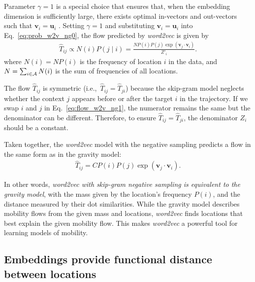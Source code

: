 \documentclass[12pt]{article} %
\newcommand{\vect}[1]{\boldsymbol{#1}}
\def\given{\mid}
\def\ie{i.e.,~}
\begin{document}
Parameter $\gamma=1$ is a special choice that ensures that, when the embedding dimension is sufficiently large, there exists optimal in-vectors and out-vectors such that $\vect{v}_i = \vect{u}_i$ \autocite{levy2014neural}.
Setting $\gamma = 1$ and substituting $\vect{v}_i = \vect{u}_i$ into Eq.~\ref{eq:prob_w2v_ng0}, the flow predicted by {\it word2vec} is given by
\begin{align}
	\widehat{T}_{ij} \propto  N(i) P(j\given i) = \frac{NP(i)P(j)\exp(\vect{v}_j \cdot \vect{v}_{i})}{Z'_i}. \label{eq:flow_w2v_ng1}
\end{align}
where $N(i) = NP(i)$ is the frequency of location $i$ in the data, and $N=\sum_{i \in {\cal A}} N(i)$ is the sum of frequencies of all locations.

The flow $\widehat{T}_{ij}$ is symmetric (\ie $\widehat{T}_{ij}=\widehat{T}_{ji}$) because the skip-gram model neglects whether the context $j$ appears before or after the target $i$ in the trajectory.
If we swap $i$ and $j$ in Eq.~\ref{eq:flow_w2v_ng1}, the numerator remains the same but the denominator can be different.
Therefore, to ensure $\widehat{T}_{ij}=\widehat{T}_{ji}$, the denominator $Z_i$ should be a constant.

Taken together, the {\it word2vec} model with the negative sampling predicts a flow in the same form as in the gravity model:
\begin{align}
	\hat{T}_{ij}=  C P(i) P(j)  \exp(\bm{v}_j \cdot \bm{v}_{i}). \label{eq:flow_w2v_ng0}
\end{align}

In other words, \emph{word2vec with skip-gram negative sampling is equivalent to the gravity model}, with the mass given by the location's frequency $P(i)$, and the distance measured by their dot similarities.
While the gravity model describes mobility flows from the given mass and locations, {\it word2vec}
finds locations that best explain the given mobility flow.
This makes \textit{word2vec} a powerful tool for learning models of mobility.


%
%
%
\subsection*{Embeddings provide functional distance between locations}
\end{document}
